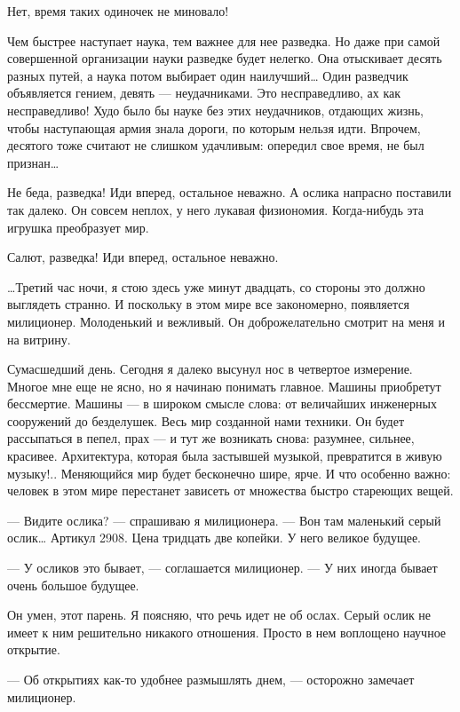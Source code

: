    Нет, время таких одиночек не миновало!

   Чем быстрее наступает  наука, тем  важнее для  нее разведка.  Но даже  при
   самой совершенной организации науки разведке будет нелегко. Она отыскивает
   десять разных путей, а наука потом выбирает один наилучший… Один разведчик
   объявляется гением,  девять  —  неудачниками. Это  несправедливо,  ах  как
   несправедливо! Худо было  бы науке без  этих неудачников, отдающих  жизнь,
   чтобы наступающая армия  знала дороги,  по которым  нельзя идти.  Впрочем,
   десятого тоже считают не  слишком удачливым: опередил  свое время, не  был
   признан…

   Не беда,  разведка!  Иди  вперед, остальное  неважно.  А  ослика  напрасно
   поставили так  далеко.  Он  совсем  неплох,  у  него  лукавая  физиономия.
   Когда-нибудь эта игрушка преобразует мир.

   Салют, разведка! Иди вперед, остальное неважно.

   …Третий час ночи, я стою здесь  уже минут двадцать, со стороны это  должно
   выглядеть странно. И  поскольку в  этом мире  все закономерно,  появляется
   милиционер. Молоденький и вежливый. Он  доброжелательно смотрит на меня  и
   на витрину.

   Сумасшедший день.  Сегодня я  далеко высунул  нос в  четвертое  измерение.
   Многое мне еще не ясно, но  я начинаю понимать главное. Машины  приобретут
   бессмертие. Машины  — в  широком смысле  слова: от  величайших  инженерных
   сооружений до  безделушек.  Весь  мир созданной  нами  техники.  Он  будет
   рассыпаться в пепел, прах — и  тут же возникать снова: разумнее,  сильнее,
   красивее. Архитектура, которая была застывшей музыкой, превратится в живую
   музыку!.. Меняющийся  мир  будет бесконечно  шире,  ярче. И  что  особенно
   важно: человек  в  этом  мире  перестанет  зависеть  от  множества  быстро
   стареющих вещей.

   — Видите ослика?  — спрашиваю  я милиционера.  — Вон  там маленький  серый
   ослик… Артикул 2908. Цена тридцать две копейки. У него великое будущее.

   — У осликов это  бывает, — соглашается милиционер.  — У них иногда  бывает
   очень большое будущее.

   Он умен, этот парень. Я поясняю, что речь идет не об ослах. Серый ослик не
   имеет к ним решительно никакого отношения. Просто в нем воплощено  научное
   открытие.

   — Об  открытиях  как-то  удобнее размышлять  днем,  —  осторожно  замечает
   милиционер.

